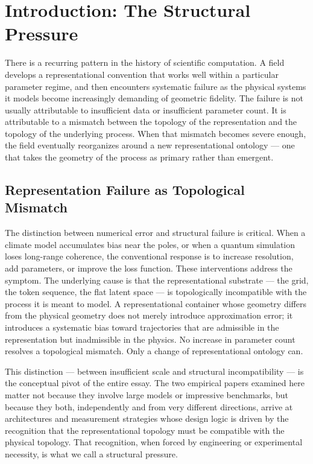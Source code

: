 \documentclass[11pt,a4paper]{article}
\theoremstyle{plain}
\theoremstyle{definition}
\theoremstyle{remark}
\begin{document}
\tableofcontents
\newpage

\section{Introduction: The Structural Pressure}
\label{sec:intro}

There is a recurring pattern in the history of scientific computation. A
field develops a representational convention that works well within a
particular parameter regime, and then encounters systematic failure as the
physical systems it models become increasingly demanding of geometric
fidelity. The failure is not usually attributable to insufficient data or
insufficient parameter count. It is attributable to a mismatch between the
topology of the representation and the topology of the underlying process.
When that mismatch becomes severe enough, the field eventually reorganizes
around a new representational ontology --- one that takes the geometry of
the process as primary rather than emergent.

\subsection{Representation Failure as Topological Mismatch}

The distinction between numerical error and structural failure is critical.
When a climate model accumulates bias near the poles, or when a quantum
simulation loses long-range coherence, the conventional response is to
increase resolution, add parameters, or improve the loss function. These
interventions address the symptom. The underlying cause is that the
representational substrate --- the grid, the token sequence, the flat
latent space --- is topologically incompatible with the process it is
meant to model. A representational container whose geometry differs from the
physical geometry does not merely introduce approximation error; it
introduces a systematic bias toward trajectories that are admissible in
the representation but inadmissible in the physics. No increase in
parameter count resolves a topological mismatch. Only a change of
representational ontology can.

This distinction --- between insufficient scale and structural incompatibility
--- is the conceptual pivot of the entire essay. The two empirical papers
examined here matter not because they involve large models or impressive
benchmarks, but because they both, independently and from very different
directions, arrive at architectures and measurement strategies whose
design logic is driven by the recognition that the representational
topology must be compatible with the physical topology. That recognition,
when forced by engineering or experimental necessity, is what we call a
structural pressure.
\end{document}
